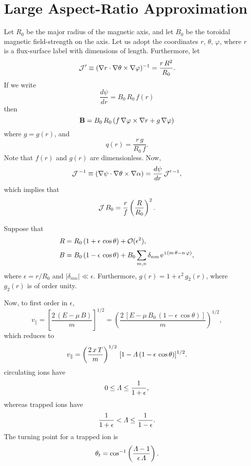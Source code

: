 \documentclass[12pt,prb,aps,notitlepage]{revtex4-1}
\begin{document}
\section{Large Aspect-Ratio Approximation}
Let $R_0$ be the major radius of the magnetic axis, and let $B_0$ be the toroidal magnetic field-strength on the axis. Let us adopt the 
coordinates $r$, $\theta$, $\varphi$, where $r$ is a flux-surface label with dimensions of length. 
Furthermore, let
\begin{equation}
{\cal J}' \equiv (\nabla r\cdot\nabla\theta\times \nabla\varphi)^{-1}= \frac{r\,R^2}{R_0}.
\end{equation}
If we write
\begin{equation}
\frac{d\psi}{dr}= B_0\,R_0\,f(r)
\end{equation}
then
\begin{equation}
{\bf B} = B_0\,R_0\,(f\,\nabla\varphi \times \nabla r + g\,\nabla\varphi)
\end{equation}
where $g=g(r)$, and 
\begin{equation}\label{qdef}
q(r) = \frac{r\,g}{R_0\,f}.
\end{equation}
Note that $f(r)$ and $g(r)$ are dimensionless. 
Now, 
\begin{equation}
{\cal J}^{\,-1} \equiv (\nabla\psi\cdot\nabla\theta\times \nabla\alpha) = \frac{d\psi}{dr}\,{\cal J}'^{\,-1},
\end{equation}
which implies that
\begin{equation}\label{jdef}
{\cal J}\,B_0 = \frac{r}{f}\left(\frac{R}{R_0}\right)^2.
\end{equation}

Suppose that
\begin{align}
R &= R_0\,(1+\epsilon\,\cos\theta) + {\cal O}(\epsilon^2),\\[0.5ex]
B&= B_0\,(1-\epsilon\,\cos\theta)+ B_0\sum_{m,n} \delta_{nm}\,{\rm e}^{\,{\rm i}\,(m\,\theta-n\,\varphi)},
\end{align}
where $\epsilon=r/R_0$ and $|\delta_{mn}|\ll \epsilon$. Furthermore, $g(r)=1+\epsilon^2\,g_2(r)$, where $g_2(r)$ is
of order unity. 

Now, to first order in $\epsilon$, 
\begin{equation}
v_\parallel = \left[\frac{2\,(E-\mu\,B)}{m}\right]^{1/2} =  \left(\frac{2\,[E-\mu\,B_0\,(1-\epsilon\,\cos\theta)]}{m}\right)^{1/2},
\end{equation}
which reduces to
\begin{equation}\label{vdef}
v_\parallel = \left(\frac{2\,x\,T}{m}\right)^{1/2}\,[1-{\mit\Lambda}\,(1-\epsilon\,\cos\theta)]^{1/2}.
\end{equation}
circulating ions have
\begin{equation}
0\leq {\mit\Lambda} \leq \frac{1}{1+\epsilon},
\end{equation}
whereas trapped ions have
\begin{equation}
\frac{1}{1+\epsilon} <{\mit\Lambda}\leq \frac{1}{1-\epsilon}.
\end{equation}
The turning point for a trapped ion is
\begin{equation}
\theta_t =\cos^{-1}\left(\frac{{\mit\Lambda}-1}{\epsilon\,{\mit\Lambda}}\right).
\end{equation}
\end{document}
